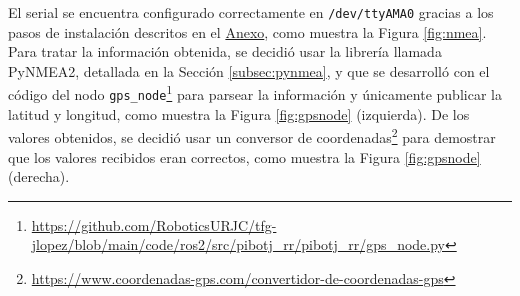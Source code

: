 El serial se encuentra configurado correctamente en \verb|/dev/ttyAMA0| gracias a los pasos de instalación descritos en el \hyperref[cap:capitulo9]{Anexo}, como muestra la Figura \ref{fig:nmea}. Para tratar la información obtenida, se decidió usar la librería llamada PyNMEA2, detallada en la Sección \ref{subsec:pynmea}, y que se desarrolló con el código del nodo \verb|gps_node|\footnote{\url{https://github.com/RoboticsURJC/tfg-jlopez/blob/main/code/ros2/src/pibotj_rr/pibotj_rr/gps_node.py}} para parsear la información y únicamente publicar la latitud y longitud, como muestra la Figura \ref{fig:gpsnode} (izquierda). De los valores obtenidos, se decidió usar un conversor de coordenadas\footnote{\url{https://www.coordenadas-gps.com/convertidor-de-coordenadas-gps}} para demostrar que los valores recibidos eran correctos, como muestra la Figura \ref{fig:gpsnode} (derecha).





